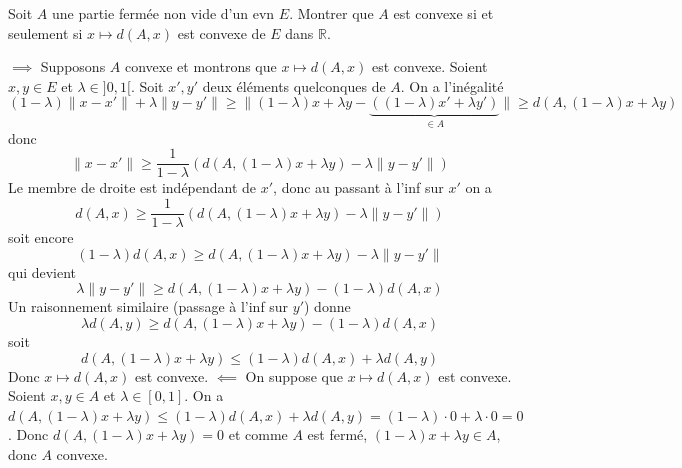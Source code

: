 \documentclass{fancybook}
\begin{document}
\begin{exercice}
Soit $A$ une partie fermée non vide d'un evn $E$.\newline 
Montrer que $A$ est convexe si et seulement si $x\mapsto d(A,x)$ est convexe de $E$ dans $\mathbb R$.
\end{exercice}
$\implies$ Supposons $A$ convexe et montrons que $x\mapsto d(A,x)$ est convexe. Soient $x,y\in E$ et $\lambda\in ]0,1[$.\newline
Soit $x',y'$ deux éléments quelconques de $A$. On a l'inégalité $$(1-\lambda)\|x-x'\| + \lambda \|y-y'\|\geq \|(1-\lambda)x+\lambda y- \underbrace{(	(1-\lambda)x'+\lambda y')}_{\in A}\|\geq d(A, (1-\lambda)x+\lambda y)$$ 
donc $$\|x-x'\| \geq \dfrac{1}{1-\lambda } (d(A, (1-\lambda)x+\lambda y) -\lambda \|y-y'\|)$$
Le membre de droite est indépendant de $x'$, donc au passant à l'inf sur $x'$ on a
$$d(A,x)\geq \dfrac{1}{1-\lambda } (d(A, (1-\lambda)x+\lambda y) -\lambda \|y-y'\|) $$
soit encore $$ (1-\lambda )d(A,x)\geq  d(A, (1-\lambda)x+\lambda y) -\lambda \|y-y'\|$$
qui devient $$ \lambda \|y-y'\| \geq d(A, (1-\lambda)x+\lambda y) - (1-\lambda )d(A,x)$$
Un raisonnement similaire (passage à l'inf sur $y'$) donne 
$$\lambda d(A,y) \geq d(A, (1-\lambda)x+\lambda y) - (1-\lambda )d(A,x)$$
soit $$ d(A, (1-\lambda)x+\lambda y) \leq (1-\lambda )d(A,x) + \lambda d(A,y)$$
Donc $x\mapsto d(A,x)$ est convexe.\newline
\newline 
$\impliedby$ On suppose que $x\mapsto d(A,x)$ est convexe. Soient $x,y\in A$ et $\lambda\in [0,1]$. \newline
On a $d(A,(1-\lambda)x+\lambda y)\leq (1-\lambda)d(A,x) + \lambda d(A,y) = (1-\lambda)\cdot 0+ \lambda \cdot 0 = 0$.\newline
Donc $d(A,(1-\lambda)x+\lambda y)=0$ et comme $A$ est fermé, $(1-\lambda)x+\lambda y\in A$, donc $A$ convexe.
\end{document}
